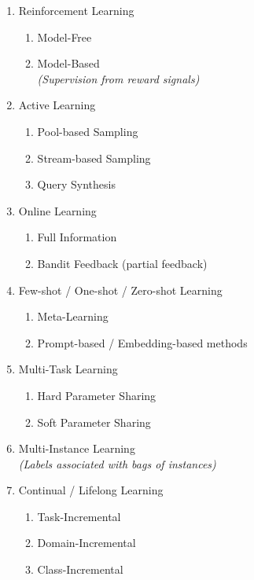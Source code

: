 \begin{multicols}{2}
\begin{enumerate}
    \item Reinforcement Learning
    \begin{enumerate}
      \item Model-Free
      \item Model-Based \\
      \textit{(Supervision from reward signals)}
    \end{enumerate}

    \item Active Learning
    \begin{enumerate}
      \item Pool-based Sampling
      \item Stream-based Sampling
      \item Query Synthesis
    \end{enumerate}

    \item Online Learning
    \begin{enumerate}
      \item Full Information
      \item Bandit Feedback (partial feedback)
    \end{enumerate}

    \item Few-shot / One-shot / Zero-shot Learning
    \begin{enumerate}
      \item Meta-Learning
      \item Prompt-based / Embedding-based methods
    \end{enumerate}

    \item Multi-Task Learning
    \begin{enumerate}
      \item Hard Parameter Sharing
      \item Soft Parameter Sharing
    \end{enumerate}

    \item Multi-Instance Learning \\
    \textit{(Labels associated with bags of instances)}

    \item Continual / Lifelong Learning
    \begin{enumerate}
      \item Task-Incremental
      \item Domain-Incremental
      \item Class-Incremental
    \end{enumerate}


\end{enumerate}
\end{multicols}
